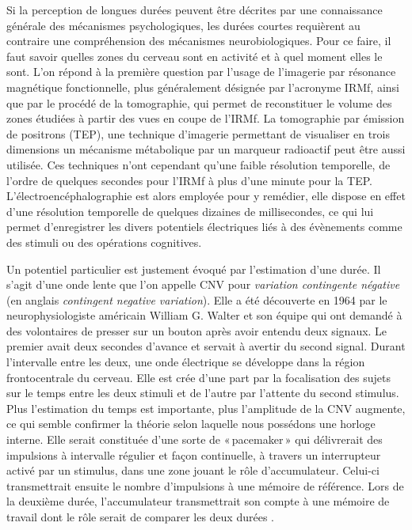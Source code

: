 \documentclass[12pt,fleqn,oneside,openany]{book} %
\begin{document}
Si la perception de longues durées peuvent être décrites par une connaissance générale des mécanismes psychologiques, les durées courtes requièrent au contraire une compréhension des mécanismes neurobiologiques. Pour ce faire, il faut savoir quelles zones du cerveau sont en activité et à quel moment elles le sont. L'on répond à la première question par l'usage de l'imagerie par résonance magnétique fonctionnelle, plus généralement désignée par l'acronyme IRMf, ainsi que par le procédé de la tomographie, qui permet de reconstituer le volume des zones étudiées à partir des vues en coupe de l'IRMf. La tomographie par émission de positrons (TEP), une technique d'imagerie permettant de visualiser en trois dimensions un mécanisme métabolique par un marqueur radioactif peut être aussi utilisée. Ces techniques n'ont cependant qu'une faible résolution temporelle, de l'ordre de quelques secondes pour l'IRMf à plus d'une minute pour la TEP. L'électroencéphalographie est alors employée pour y remédier, elle dispose en effet d'une résolution temporelle de quelques dizaines de millisecondes, ce qui lui permet d'enregistrer les divers potentiels électriques liés à des évènements comme des stimuli ou des opérations cognitives. 

Un potentiel particulier est justement évoqué par l'estimation d'une durée. Il s'agit d'une onde lente que l'on appelle CNV pour \emph{variation contingente négative} (en anglais \emph{contingent negative variation}). Elle a été découverte en 1964 par le neurophysiologiste américain William G. Walter et son équipe qui ont demandé à des volontaires de presser sur un bouton après avoir entendu deux signaux. Le premier avait deux secondes d'avance et servait à avertir du second signal. Durant l'intervalle entre les deux, une onde électrique se développe dans la région frontocentrale du cerveau. Elle est crée d'une part par la focalisation des sujets sur le temps entre les deux stimuli et de l'autre par l'attente du second stimulus. Plus l'estimation du temps est importante, plus l'amplitude de la CNV augmente, ce qui semble confirmer la théorie selon laquelle nous possédons une horloge interne. Elle serait constituée d'une sorte de «\,pacemaker\,» qui délivrerait des impulsions à intervalle régulier et façon continuelle, à travers un interrupteur activé par un stimulus, dans une zone jouant le rôle d'accumulateur. Celui-ci transmettrait ensuite le nombre d'impulsions à une mémoire de référence. Lors de la deuxième durée, l'accumulateur transmettrait son compte à une mémoire de travail dont le rôle serait de comparer les deux durées \cite{gibbon1984}.
\end{document}
